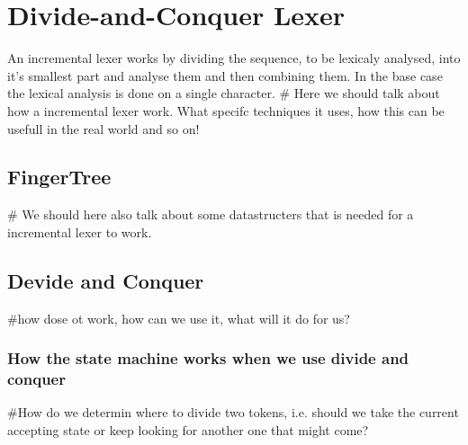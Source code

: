 \chapter{Divide-and-Conquer Lexer}
An incremental lexer works by dividing the sequence, to be lexicaly analysed,
into it's smallest part and analyse them and then combining them. In the base
case the lexical analysis is done on a single character.
\# Here we should talk about how a incremental lexer work. What specifc
techniques it uses, how this can be usefull in the real world and so on!

\section{FingerTree}
\# We should here also talk about some datastructers that is needed for a
incremental lexer to work. 

\section{Devide and Conquer}
\#how dose ot work, how can we use it, what will it do for us?

\subsection{How the state machine works when we use divide and conquer} %
\#How do we determin where to divide two tokens, i.e. should we take the current
  accepting state or keep looking for another one that might come?

